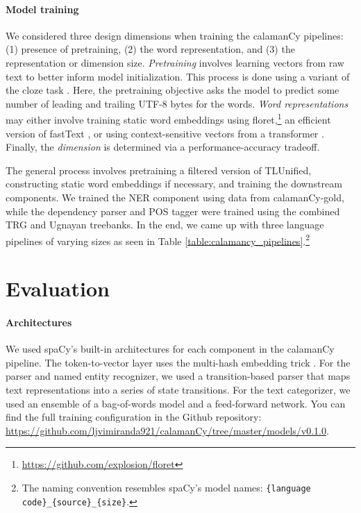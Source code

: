 \documentclass[11pt]{article}
\begin{document}
\paragraph*{Model training}

We considered three design dimensions when training the calamanCy pipelines: (1) presence of pretraining, (2) the word representation, and (3) the representation or dimension size.
\textit{Pretraining} involves learning vectors from raw text to better inform model initialization.
This process is done using a variant of the cloze task \citep{Devlin2019BERTPO}.
Here, the pretraining objective asks the model to predict some number of leading and trailing UTF-8 bytes for the words.
\textit{Word representations} may either involve training static word embeddings using floret,\footnote[3]{\url{https://github.com/explosion/floret}} an efficient version of fastText \citep{Bojanowski2016EnrichingWV}, or using context-sensitive vectors from a transformer \citep{Vaswani2017AttentionIA}.
Finally, the \textit{dimension} is determined via a performance-accuracy tradeoff.


The general process involves pretraining a filtered version of TLUnified, constructing static word embeddings if necessary, and training the downstream components.
We trained the NER component using data from calamanCy-gold, while the dependency parser and POS tagger were trained using the combined TRG and Ugnayan treebanks.
In the end, we came up with three language pipelines of varying sizes as seen in Table \ref{table:calamancy_pipelines}.\footnote[4]{
  The naming convention resembles spaCy's model names: \texttt{\{language code\}\_\{source\}\_\{size\}}. 
}

\section{Evaluation}



\paragraph*{Architectures}

We used spaCy's built-in architectures for each component in the calamanCy pipeline.
The token-to-vector layer uses the multi-hash embedding trick \citep{Miranda2022MultiHE}.
For the parser and named entity recognizer, we used a transition-based parser that maps text representations into a series of state transitions.
For the text categorizer, we used an ensemble of a bag-of-words model and a feed-forward network.
You can find the full training configuration in the Github repository: \url{https://github.com/ljvimiranda921/calamanCy/tree/master/models/v0.1.0}.
\end{document}
